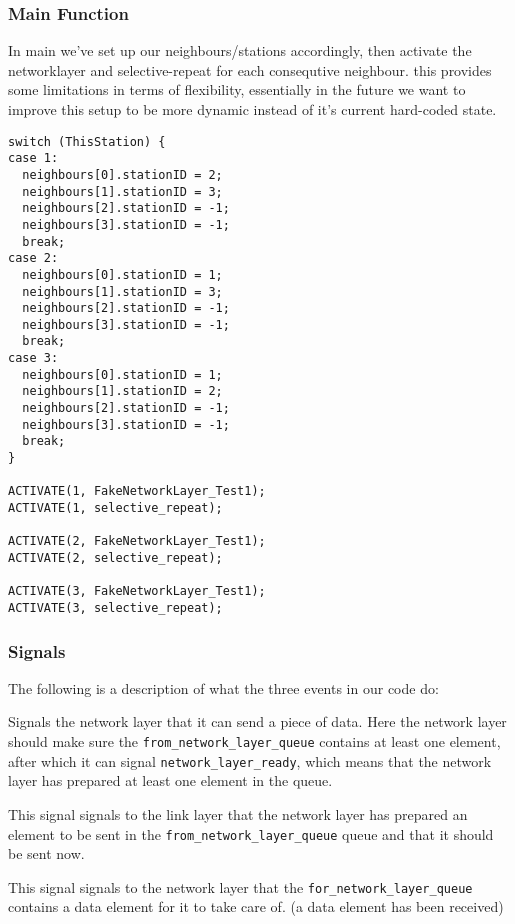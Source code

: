 \subsubsection{Main Function}
In main we've set up our neighbours/stations accordingly, then activate the networklayer and selective-repeat for each consequtive neighbour.
this provides some limitations in terms of flexibility,
essentially in the future we want to improve this setup to be more dynamic instead of it's current hard-coded state.
\begin{lstlisting}
switch (ThisStation) {
case 1:
  neighbours[0].stationID = 2;
  neighbours[1].stationID = 3;
  neighbours[2].stationID = -1;
  neighbours[3].stationID = -1;
  break;
case 2:
  neighbours[0].stationID = 1;
  neighbours[1].stationID = 3;
  neighbours[2].stationID = -1;
  neighbours[3].stationID = -1;
  break;
case 3:
  neighbours[0].stationID = 1;
  neighbours[1].stationID = 2;
  neighbours[2].stationID = -1;
  neighbours[3].stationID = -1;
  break;
}

ACTIVATE(1, FakeNetworkLayer_Test1);
ACTIVATE(1, selective_repeat);

ACTIVATE(2, FakeNetworkLayer_Test1);
ACTIVATE(2, selective_repeat);

ACTIVATE(3, FakeNetworkLayer_Test1);
ACTIVATE(3, selective_repeat);
\end{lstlisting}

\subsubsection{Signals}
The following is a description of what the three events in our code do:
\begin{description}[leftmargin=1em, style=nextline]
\item [\texttt{network\_layer\_allowed\_to\_send}] Signals the network layer that it can send a piece of data.
Here the network layer should make sure the \texttt{from\_network\_layer\_queue}
contains at least one element, after which it can signal \texttt{network\_layer\_ready},
which means that the network layer has prepared at least one element in the queue.

\item [\texttt{network\_layer\_ready}] This signal signals to the link layer that the network layer has prepared an element to be sent in the
  \texttt{from\_network\_layer\_queue} queue and that it should be sent now.

\item [\texttt{data\_for\_network\_layer}]
This signal signals to the network layer that the
\texttt{for\_network\_layer\_queue} contains a data element for it to take care of. (a data element has been received)
\end{description}

\hfill \break
